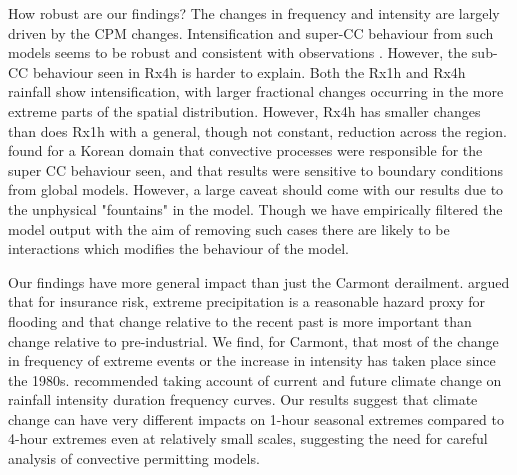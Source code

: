 \documentclass[11pt,a4paper]{article}
\begin{document}
How robust are our findings? The changes in frequency and intensity are largely driven by the CPM changes. Intensification and super-CC behaviour from such models seems to be robust and consistent with observations \parencite{fowler2021rainfall_extremes}. However, the sub-CC behaviour seen in Rx4h is harder to explain.  Both the Rx1h and Rx4h rainfall show intensification, with larger fractional changes occurring in the more extreme parts of the spatial distribution. However, Rx4h has smaller changes than does Rx1h with a general, though not constant, reduction across the region.  \cite{Lee2022CPM_Korea}  found for a Korean domain that convective processes were responsible for the super CC behaviour seen, and that results were sensitive to boundary conditions from global models. However, a large caveat should come with our results due to the unphysical "fountains" in the model. Though we have empirically filtered the model output with the aim of removing such cases there are likely to be interactions which modifies the behaviour of the model. 

Our findings have more general impact than just the Carmont derailment. \cite{lang2024catmodels} argued that  for insurance risk, extreme precipitation is a reasonable hazard proxy for flooding and  that change relative to the recent past is more important than change relative to pre-industrial. We find, for Carmont, that most of the change in frequency of extreme events or the increase in intensity has taken place since the 1980s.  \cite{martel2021rainfall_ifd} recommended taking account of current and future climate change on rainfall intensity duration frequency curves. Our results suggest that climate change can have very different impacts on 1-hour seasonal extremes compared to 4-hour extremes even at relatively small scales, suggesting the need for careful analysis of convective permitting models. 


\end{document}
